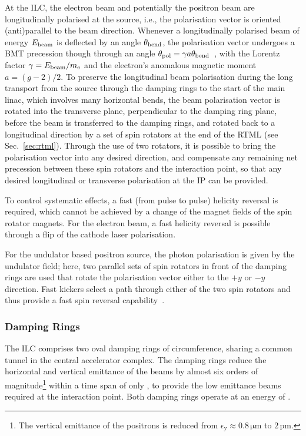 At the ILC, the electron beam and potentially the positron beam are longitudinally polarised at the source, i.e., the polarisation vector is oriented (anti)parallel to the beam direction.
Whenever a longitudinally polarised beam of energy $E_{\mathrm{beam}}$ is deflected by an angle $\theta_{\mathrm{bend}}$, the polarisation vector undergoes a BMT precession though through an angle $\theta_{\mathrm{pol}} =  \gamma a \theta_{\mathrm{bend}}$~\cite{Moffeit:2005pb}, 
with the Lorentz factor $\gamma = E_{\mathrm{beam}}/m_{\mathrm{e}}$ and the electron's anomalous magnetic moment $a = (g-2)/2$. 
To preserve the longitudinal beam polarisation during the long transport from the source through the damping rings to the start of the main linac, which involves many horizontal bends, the beam polarisation vector is rotated into the transverse plane, perpendicular to the damping ring plane, before the beam is transferred to the damping rings, and rotated back to a longitudinal direction by a set of spin rotators at the end of the RTML (see Sec.~\ref{sec:rtml}).
Through the use of two rotators, it is possible to bring the polarisation vector into any desired direction, and compensate any remaining net precession between these spin rotators and the interaction point, so that any desired longitudinal or transverse polarisation at the IP can be provided.

To control systematic effects, a fast (from pulse to pulse) helicity reversal is required, which cannot be achieved by a change of the magnet fields of the spin rotator magnets.
For the electron beam, a fast helicity reversal is possible through a flip of the cathode laser polarisation.

For the undulator based positron source, the photon polarisation is given by the undulator field; here, two parallel sets of spin rotators in front of the damping rings are used that rotate the polarisation vector either to the $+y$ or $-y$ direction. 
Fast kickers select a path through either of the two spin rotators and thus provide a fast spin reversal capability~\cite{Moffeit:2005pb,Malysheva:2016jdr}.




\subsubsection{Damping Rings}

The ILC comprises two oval damping rings of  circumference, sharing a common tunnel in the central accelerator complex.
The damping rings reduce the horizontal and vertical emittance of the beams by almost six orders of magnitude\footnote{The vertical emittance of the positrons is reduced from $\epsilon_{\mathrm{y}} \approx 0.8\,{\mathrm{\mu m}}$ to $2\,{\mathrm{pm}}$.} within a time span of only , to provide the low emittance beams required at the interaction point. 
Both damping rings operate at an energy of .

